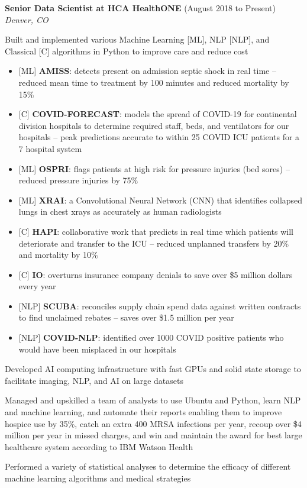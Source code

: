 \begin{resume}
    {\bf Senior Data Scientist at HCA HealthONE} (August 2018 to Present)\\\vspace{2mm}%
    \textit{Denver, CO}
    \begin{stuff}
        \vspace*{1mm}
            \item Built and implemented various Machine Learning {[ML]}, NLP {[NLP]}, and Classical {[C]} algorithms in Python to improve care and reduce cost
            \begin{itemize}
                \item {[ML]} {\bf AMISS}: detects present on admission septic shock in real time -- reduced mean time to treatment by 100 minutes and reduced mortality by 15\%
                \item {[C]} {\bf COVID-FORECAST}: models the spread of COVID-19 for continental division hospitals to determine required staff, beds, and ventilators for our hospitals – peak predictions accurate to within 25 COVID ICU patients for a 7 hospital system  
                \item {[ML]} {\bf OSPRI}: flags patients at high risk for pressure injuries (bed sores) -- reduced pressure injuries by 75\%
                \item {[ML]} {\bf XRAI}: a Convolutional Neural Network (CNN) that identifies collapsed lungs in chest xrays as accurately as human radiologists
                \item {[C]} {\bf HAPI}: collaborative work that predicts in real time which patients will deteriorate and transfer to the ICU – reduced unplanned transfers by 20\% and mortality by 10\%
                \item {[C]} {\bf IO}: overturns insurance company denials to save over \$5 million dollars every year
                \item {[NLP]} {\bf SCUBA}: reconciles supply chain spend data against written contracts to find unclaimed rebates -- saves over \$1.5 million per year
                \item {[NLP]} {\bf COVID-NLP}: identified over 1000 COVID positive patients who would have been misplaced in our hospitals 
             \end{itemize} 
            \item Developed AI computing infrastructure with fast GPUs and solid state storage to facilitate imaging, NLP, and AI on large datasets
            \item Managed and upskilled a team of analysts to use Ubuntu and Python, learn NLP and machine learning, and automate their reports enabling them to improve hospice use by 35\%, catch an extra 400 MRSA infections per year, recoup over \$4 million per year in missed charges, and win and maintain the award for best large healthcare system according to IBM Watson Health
            \item Performed a variety of statistical analyses to determine the efficacy of different machine learning algorithms and medical strategies
    \end{stuff}


\end{resume}
